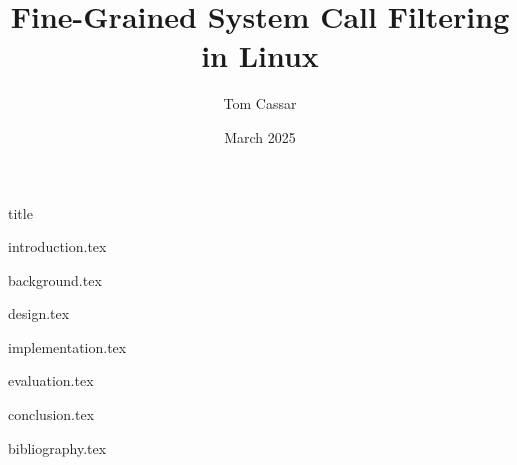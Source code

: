 \documentclass[fontsize=12pt]{article}
\title{Fine-Grained System Call Filtering in Linux}
\author{Tom Cassar}
\date{March 2025}
\begin{document}
{title}

\clearpage
\thispagestyle{empty}

\begin{multicols*}{2}

{introduction.tex}

{background.tex}

{design.tex}

{implementation.tex}

{evaluation.tex}

{conclusion.tex}

{bibliography.tex}

\end{multicols*}
\end{document}
